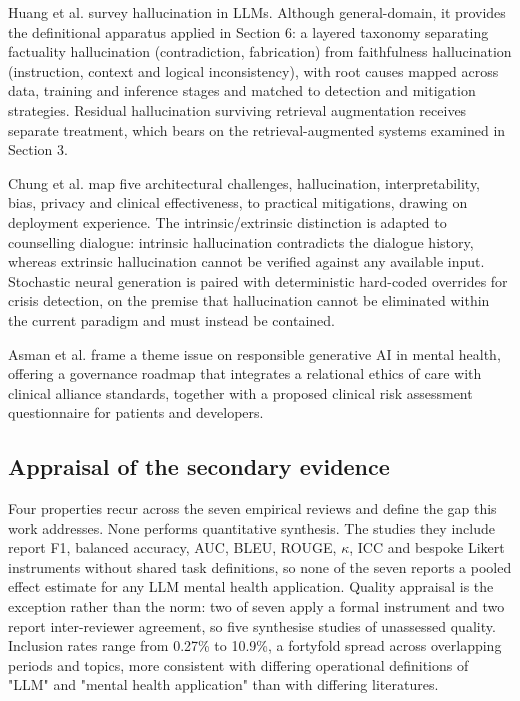 \documentclass[11pt]{article}
\begin{document}
	Huang et al.\cite{Huang_2025} survey hallucination in LLMs. Although general-domain, it provides the definitional apparatus applied in Section 6: a layered taxonomy separating factuality hallucination (contradiction, fabrication) from faithfulness hallucination (instruction, context and logical inconsistency), with root causes mapped across data, training and inference stages and matched to detection and mitigation strategies. Residual hallucination surviving retrieval augmentation receives separate treatment, which bears on the retrieval-augmented systems examined in Section 3.
	
	Chung et al.\cite{chung2023challengeslargelanguagemodels} map five architectural challenges, hallucination, interpretability, bias, privacy and clinical effectiveness, to practical mitigations, drawing on deployment experience. The intrinsic/extrinsic distinction is adapted to counselling dialogue: intrinsic hallucination contradicts the dialogue history, whereas extrinsic hallucination cannot be verified against any available input. Stochastic neural generation is paired with deterministic hard-coded overrides for crisis detection, on the premise that hallucination cannot be eliminated within the current paradigm and must instead be contained.
	
	Asman et al.\cite{info:doi/10.2196/70439} frame a theme issue on responsible generative AI in mental health, offering a governance roadmap that integrates a relational ethics of care with clinical alliance standards, together with a proposed clinical risk assessment questionnaire for patients and developers.
	
	\subsection{Appraisal of the secondary evidence}
	
	Four properties recur across the seven empirical reviews and define the gap this work addresses. None performs quantitative synthesis. The studies they include report F1, balanced accuracy, AUC, BLEU, ROUGE, $\kappa$, ICC and bespoke Likert instruments without shared task definitions, so none of the seven reports a pooled effect estimate for any LLM mental health application. Quality appraisal is the exception rather than the norm: two of seven apply a formal instrument and two report inter-reviewer agreement, so five synthesise studies of unassessed quality. Inclusion rates range from 0.27\% to 10.9\%, a fortyfold spread across overlapping periods and topics, more consistent with differing operational definitions of "LLM" and "mental health application" than with differing literatures.
	
\end{document}
